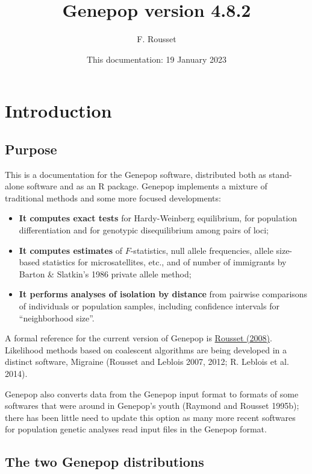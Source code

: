 \documentclass[
  12pt,
]{book}
\title{Genepop version 4.8.2}
\author{F. Rousset}
\date{This documentation: 19 January 2023}
\begin{document}
\maketitle

{
\setcounter{tocdepth}{1}
\tableofcontents
}
\hypertarget{introduction}{%
\chapter{Introduction}\label{introduction}}

\hypertarget{purpose}{%
\section{Purpose}\label{purpose}}

This is a documentation for the Genepop software, distributed both as stand-alone software and as an R package. Genepop implements a mixture of traditional methods and some more focused developments:

\begin{itemize}
\item
  \textbf{It computes exact tests} for Hardy-Weinberg equilibrium, for population differentiation and
  for genotypic disequilibrium among pairs of loci;
\item
  \textbf{It computes estimates} of \(F\)-statistics, null allele frequencies, allele size-based
  statistics for microsatellites, etc., and of number of immigrants by Barton \& Slatkin's 1986 private allele method;
\item
  \textbf{It performs analyses of isolation by distance} from pairwise comparisons of individuals or population samples,
  including confidence intervals for ``neighborhood size''.
\end{itemize}

A formal reference for the current version of Genepop is \href{https://doi.org/10.1111/j.1471-8286.2007.01931.x}{Rousset (2008)}.
Likelihood methods based on coalescent algorithms are being developed in a distinct software, Migraine (Rousset and Leblois 2007, 2012; R. Leblois et al. 2014).

Genepop also converts data from the Genepop input format to formats of some softwares that were around in Genepop's youth (Raymond and Rousset 1995b); there has been little need to update this option as many more recent softwares for population genetic analyses read input files in the Genepop format.

\hypertarget{the-two-genepop-distributions}{%
\section{The two Genepop distributions}\label{the-two-genepop-distributions}}
\end{document}
